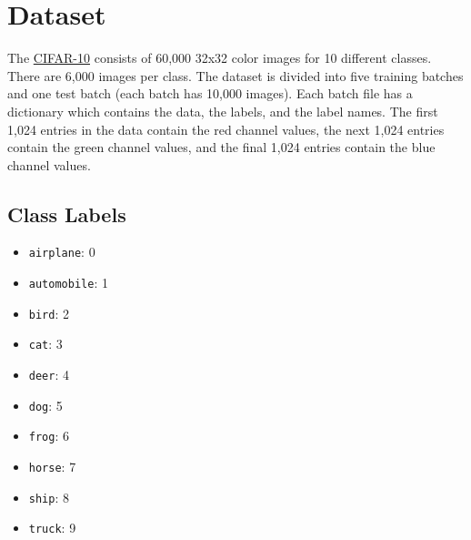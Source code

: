 \section{Dataset}
\label{sec:dataset}

The \href{http://www.cs.toronto.edu/~kriz/cifar.html}{CIFAR-10} consists of 60,000 32x32 color images for 10 different classes. There are 6,000 images per class. The dataset is divided into five training batches and one test batch (each batch has 10,000 images). Each batch file has a dictionary which contains the data, the labels, and the label names. The first 1,024 entries in the data contain the red channel values, the next 1,024 entries contain the green channel values, and the final 1,024 entries contain the blue channel values.

\subsection{Class Labels}
\label{sec:dataset:classLabels}
\begin{itemize}
    \item \verb|airplane|: 0
    \item \verb|automobile|: 1
    \item \verb|bird|: 2
    \item \verb|cat|: 3
    \item \verb|deer|: 4
    \item \verb|dog|: 5
    \item \verb|frog|: 6
    \item \verb|horse|: 7
    \item \verb|ship|: 8
    \item \verb|truck|: 9
\end{itemize}

